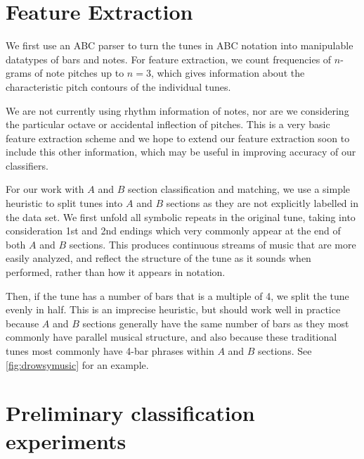 \documentclass{article} %
\begin{document}
\section{Feature Extraction}

We first use an ABC parser to turn the tunes in ABC notation into manipulable
datatypes of bars and notes. For feature extraction, we count frequencies of
$n$-grams of note pitches up to $n=3$, which gives information about the
characteristic pitch contours of the individual tunes.

We are not currently using rhythm information of notes, nor are we considering
the particular octave or accidental inflection of pitches. This is a very basic
feature extraction scheme and we hope to extend our feature extraction soon to
include this other information, which may be useful in improving accuracy of our
classifiers.

For our work with $A$ and $B$ section classification and matching, we use a
simple heuristic to split tunes into $A$ and $B$ sections as they are not
explicitly labelled in the data set. We first unfold all symbolic repeats in the
original tune, taking into consideration 1st and 2nd endings which very commonly
appear at the end of both $A$ and $B$ sections. This produces continuous streams
of music that are more easily analyzed, and reflect the structure of the tune as
it sounds when performed, rather than how it appears in notation.

Then, if the tune has a number of bars that is a multiple of 4, we split the
tune evenly in half. This is an imprecise heuristic, but should work well in
practice because $A$ and $B$ sections generally have the same number of bars as
they most commonly have parallel musical structure, and also because these
traditional tunes most commonly have 4-bar phrases within $A$ and $B$ sections.
See \cref{fig:drowsymusic} for an example.

\section{Preliminary classification experiments}
\end{document}
